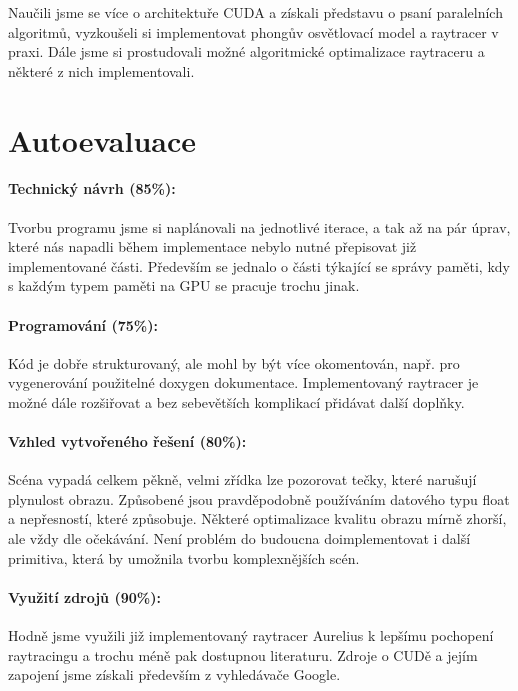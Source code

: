 \documentclass[12pt,a4paper,titlepage,final]{report}
\begin{document}
Naučili jsme se více o architektuře CUDA a získali představu o psaní paralelních algoritmů, vyzkoušeli si implementovat phongův osvětlovací model a raytracer v praxi. Dále jsme si prostudovali možné algoritmické optimalizace raytraceru a některé z nich implementovali.

\section{Autoevaluace}

\paragraph{Technický návrh (85\%):} 
Tvorbu programu jsme si naplánovali na jednotlivé iterace, a tak až na pár úprav, které nás napadli během implementace nebylo nutné přepisovat již implementované části. Především se jednalo o části týkající se správy paměti, kdy s každým typem paměti na GPU se pracuje trochu jinak.

\paragraph{Programování (75\%):}
Kód je dobře strukturovaný, ale mohl by být více okomentován, např. pro vygenerování použitelné doxygen dokumentace. 
Implementovaný raytracer je možné dále rozšiřovat a bez sebevětších komplikací přidávat další doplňky.

\paragraph{Vzhled vytvořeného řešení (80\%):} 
Scéna vypadá celkem pěkně, velmi zřídka lze pozorovat tečky, které narušují plynulost obrazu. Způsobené jsou pravděpodobně používáním datového typu float a nepřesností, které způsobuje. Některé optimalizace kvalitu obrazu mírně zhorší, ale vždy dle očekávání. Není problém do budoucna doimplementovat i další primitiva, která by umožnila tvorbu komplexnějších scén.

\paragraph{Využití zdrojů (90\%):}
Hodně jsme využili již implementovaný raytracer Aurelius k lepšímu pochopení raytracingu a trochu méně pak dostupnou literaturu. Zdroje o CUDě a jejím zapojení jsme získali především z vyhledávače Google.
\end{document}
